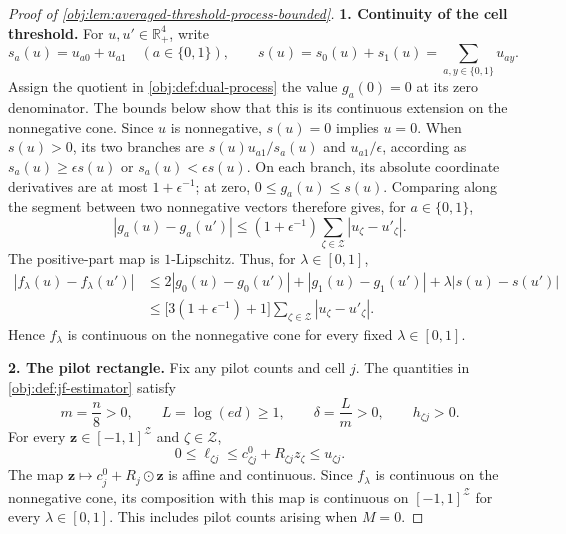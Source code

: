 \begin{proof}[Proof of \cref{obj:lem:averaged-threshold-process-bounded}]
\noindent\textbf{1. Continuity of the cell threshold.}
For \(u,u'\in\mathbb R_+^4\), write
\[
s_a(u)=u_{a0}+u_{a1}\quad(a\in\{0,1\}),
\qquad
s(u)=s_0(u)+s_1(u)=\sum_{a,y\in\{0,1\}}u_{ay}.
\]
Assign the quotient in \cref{obj:def:dual-process} the value \(g_a(0)=0\) at its zero denominator. The bounds below show that this is its continuous extension on the nonnegative cone. Since \(u\) is nonnegative, \(s(u)=0\) implies \(u=0\). When \(s(u)>0\), its two branches are \(s(u)u_{a1}/s_a(u)\) and \(u_{a1}/\epsilon\), according as \(s_a(u)\geq\epsilon s(u)\) or \(s_a(u)<\epsilon s(u)\). On each branch, its absolute coordinate derivatives are at most \(1+\epsilon^{-1}\); at zero, \(0\leq g_a(u)\leq s(u)\). Comparing along the segment between two nonnegative vectors therefore gives, for \(a\in\{0,1\}\),
\[
|g_a(u)-g_a(u')|
\leq(1+\epsilon^{-1})\sum_{\zeta\in\mathcal Z}|u_\zeta-u'_\zeta|.
\]
The positive-part map is \(1\)-Lipschitz. Thus, for \(\lambda\in[0,1]\),
\[
\begin{aligned}
|f_\lambda(u)-f_\lambda(u')|
&\leq 2|g_0(u)-g_0(u')|
   +|g_1(u)-g_1(u')|
   +\lambda|s(u)-s(u')|\\
&\leq \bigl[3(1+\epsilon^{-1})+1\bigr]
       \sum_{\zeta\in\mathcal Z}|u_\zeta-u'_\zeta|.
\end{aligned}
\]
Hence \(f_\lambda\) is continuous on the nonnegative cone for every fixed \(\lambda\in[0,1]\).

\noindent\textbf{2. The pilot rectangle.}
Fix any pilot counts and cell \(j\). The quantities in \cref{obj:def:jf-estimator} satisfy
\[
m=\frac n8>0,\qquad L=\log(ed)\geq1,\qquad
\delta=\frac Lm>0,\qquad h_{\zeta j}>0.
\]
For every \(\boldsymbol z\in[-1,1]^{\mathcal Z}\) and \(\zeta\in\mathcal Z\),
\[
0\leq\ell_{\zeta j}
\leq c^0_{\zeta j}+R_{\zeta j}z_\zeta
\leq u_{\zeta j}.
\]
The map \(\boldsymbol z\mapsto c_j^0+R_j\odot\boldsymbol z\) is affine and continuous. Since \(f_\lambda\) is continuous on the nonnegative cone, its composition with this map is continuous on \([-1,1]^{\mathcal Z}\) for every \(\lambda\in[0,1]\). This includes pilot counts arising when \(M=0\).


\end{proof}
